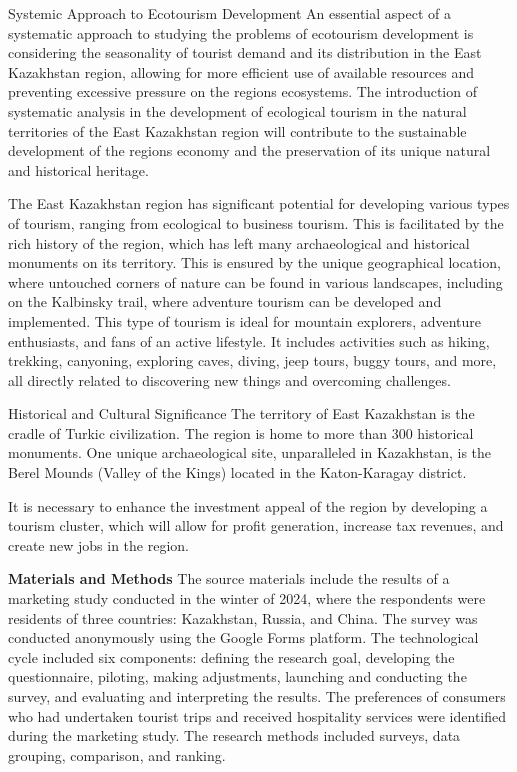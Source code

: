 \begin{multicols}{2}
Systemic Approach to Ecotourism Development An essential aspect of a
systematic approach to studying the problems of ecotourism development
is considering the seasonality of tourist demand and its distribution in
the East Kazakhstan region, allowing for more efficient use of available
resources and preventing excessive pressure on the
region\textquotesingle s ecosystems. The introduction of systematic
analysis in the development of ecological tourism in the natural
territories of the East Kazakhstan region will contribute to the
sustainable development of the region\textquotesingle s economy and the
preservation of its unique natural and historical heritage.

The East Kazakhstan region has significant potential for developing
various types of tourism, ranging from ecological to business tourism.
This is facilitated by the rich history of the region, which has left
many archaeological and historical monuments on its territory. This is
ensured by the unique geographical location, where untouched corners of
nature can be found in various landscapes, including on the Kalbinsky
trail, where adventure tourism can be developed and implemented. This
type of tourism is ideal for mountain explorers, adventure enthusiasts,
and fans of an active lifestyle. It includes activities such as hiking,
trekking, canyoning, exploring caves, diving, jeep tours, buggy tours,
and more, all directly related to discovering new things and overcoming
challenges.

Historical and Cultural Significance The territory of East Kazakhstan is
the cradle of Turkic civilization. The region is home to more than 300
historical monuments. One unique archaeological site, unparalleled in
Kazakhstan, is the Berel Mounds (Valley of the Kings) located in the
Katon-Karagay district.

It is necessary to enhance the investment appeal of the region by
developing a tourism cluster, which will allow for profit generation,
increase tax revenues, and create new jobs in the region.

{\bfseries Materials and Methods} The source materials include the results
of a marketing study conducted in the winter of 2024, where the
respondents were residents of three countries: Kazakhstan, Russia, and
China. The survey was conducted anonymously using the Google Forms
platform. The technological cycle included six components: defining the
research goal, developing the questionnaire, piloting, making
adjustments, launching and conducting the survey, and evaluating and
interpreting the results. The preferences of consumers who had
undertaken tourist trips and received hospitality services were
identified during the marketing study. The research methods included
surveys, data grouping, comparison, and ranking.


\end{multicols}
